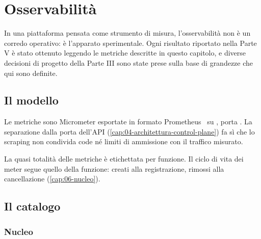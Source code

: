 \chapter{Osservabilit\`a}
\label{cap:21-osservabilita}

In una piattaforma pensata come strumento di misura, l'osservabilit\`a non \`e un
corredo operativo: \`e l'apparato sperimentale. Ogni risultato riportato nella
Parte V \`e stato ottenuto leggendo le metriche descritte in questo capitolo, e
diverse decisioni di progetto della Parte III sono state prese sulla base di
grandezze che qui sono definite.

\section{Il modello}

Le metriche sono Micrometer esportate in formato Prometheus~\cite{prometheus} su
, porta . La separazione dalla porta
dell'API (\cref{cap:04-architettura-control-plane}) fa s\`i che lo scraping non
condivida code n\'e limiti di ammissione con il traffico misurato.

La quasi totalit\`a delle metriche \`e etichettata per funzione. Il ciclo di vita
dei meter segue quello della funzione: creati alla registrazione, rimossi alla
cancellazione (\cref{cap:06-nucleo}).

\section{Il catalogo}

\subsection{Nucleo}

